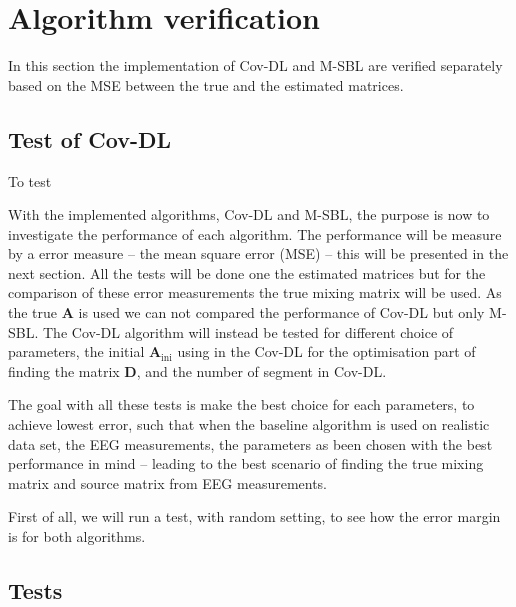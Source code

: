 \section{Algorithm verification}
In this section the implementation of Cov-DL and M-SBL are verified separately based on the MSE between the true and the estimated matrices.

\subsection{Test of Cov-DL}
To test 	



With the implemented algorithms, Cov-DL and M-SBL, the purpose is now to investigate the performance of each algorithm. The performance will be measure by a error measure -- the mean square error (MSE) -- this will be presented in the next section. 
All the tests will be done one the estimated matrices but for the comparison of these error measurements the true mixing matrix will be used. 
As the true $\mathbf{A}$ is used we can not compared the performance of Cov-DL but only M-SBL. 
The Cov-DL algorithm will instead be tested for different choice of parameters, the initial $\mathbf{A}_{\text{ini}}$ using in the Cov-DL for the optimisation part of finding the matrix $\mathbf{D}$, and the number of segment in Cov-DL.

The goal with all these tests is make the best choice for each parameters, to achieve lowest error, such that when the baseline algorithm is used on realistic data set, the EEG measurements, the parameters as been chosen with the best performance in mind -- leading to the best scenario of finding the true mixing matrix and source matrix from EEG measurements.

First of all, we will run a test, with random setting, to see how the error margin is for both algorithms.


\subsection{Tests}


